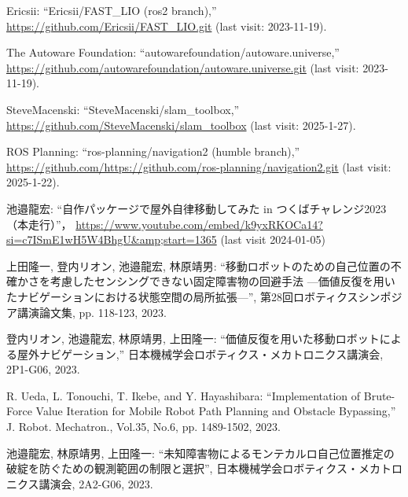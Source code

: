 \documentclass[twocolumn,9pt]{jsproceedings}
\begin{document}
\begin{thebibliography}{99}
  Ericsii: ``Ericsii/FAST\_LIO (ros2 branch),'' \url{https://github.com/Ericsii/FAST_LIO.git} (last visit: 2023-11-19).

  The Autoware Foundation: ``autowarefoundation/autoware.universe,'' \url{https://github.com/autowarefoundation/autoware.universe.git} (last visit: 2023-11-19).

  SteveMacenski: ``SteveMacenski/slam\_toolbox,'' \url{https://github.com/SteveMacenski/slam_toolbox} (last visit: 2025-1-27).

  ROS Planning: ``ros-planning/navigation2 (humble branch),'' \url{https://github.com/https://github.com/ros-planning/navigation2.git} (last visit: 2025-1-22).


  池邉龍宏: ``自作パッケージで屋外自律移動してみた in つくばチャレンジ2023（本走行）''，
  \url{https://www.youtube.com/embed/k9yxRKOCa14?si=c7ISmE1wH5W4BhgU&amp;start=1365} (last visit 2024-01-05)

上田隆一, 登内リオン, 池邉龍宏, 林原靖男: ``移動ロボットのための自己位置の不確かさを考慮したセンシングできない固定障害物の回避手法 ---価値反復を用いたナビゲーションにおける状態空間の局所拡張---'', 第28回ロボティクスシンポジア講演論文集, pp. 118-123, 2023.

  登内リオン, 池邉龍宏, 林原靖男, 上田隆一: ``価値反復を用いた移動ロボットによる屋外ナビゲーション,''
  日本機械学会ロボティクス・メカトロニクス講演会, 2P1-G06, 2023.

  R. Ueda, L. Tonouchi, T. Ikebe, and Y. Hayashibara: ``Implementation of Brute-Force Value Iteration for Mobile Robot Path Planning and Obstacle Bypassing,''
  J. Robot. Mechatron., Vol.35, No.6, pp. 1489-1502, 2023.

  池邉龍宏, 林原靖男, 上田隆一: ``未知障害物によるモンテカルロ自己位置推定の破綻を防ぐための観測範囲の制限と選択'',
  日本機械学会ロボティクス・メカトロニクス講演会, 2A2-G06, 2023.
\end{thebibliography}
\normalsize

\clearpage

\end{document}
